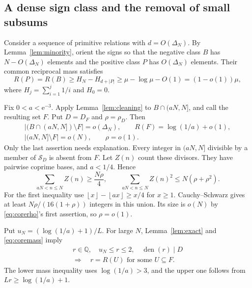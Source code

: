 \documentclass[11pt,leqno]{amsart}
\numberwithin{equation}{section}
\theoremstyle{definition}
\theoremstyle{remark}
\newcommand{\Q}{\mathbb Q}
\newcommand{\e}{\mathrm e}
\newcommand{\card}[1]{\lvert #1\rvert}
\newcommand{\floor}[1]{\left\lfloor #1\right\rfloor}
\begin{document}
\subsection{A dense sign class and the removal of small subsums}

Consider a sequence of primitive relations with $d=O(\Delta_N)$.
By Lemma~\ref{lem:minority}, orient the signs so that the negative
class $B$ has $N-O(\Delta_N)$ elements and the positive class $P$ has
$O(\Delta_N)$ elements. Their common reciprocal mass satisfies
\begin{equation}\label{eq:commonmass}
 R(P)=R(B)\ge H_N-H_{d+\card P}
 \ge\mu-\log\mu-O(1)=(1-o(1))\mu,
\end{equation}
where $H_j=\sum_{i=1}^j1/i$ and $H_0=0$.

Fix $0<a<\e^{-3}$. Apply Lemma~\ref{lem:cleaning} to $B\cap(aN,N]$,
and call the resulting set $F$. Put $D=D_F$ and $\rho=\rho_D$.
Then
\begin{gather}
 \card{(B\cap(aN,N])\setminus F}=o(\Delta_N),\qquad
 R(F)=\log(1/a)+o(1),\label{eq:coremass}\\
 \card{(aN,N]\setminus F}=o(N),\qquad \rho=o(1).
 \label{eq:corerho}
\end{gather}
Only the last assertion needs explanation. Every integer in $(aN,N]$
divisible by a member of $\mathcal S_D$ is absent from $F$.
Let $Z(n)$ count these divisors. They have pairwise coprime bases, and
$a<1/4$. Hence
\[
 \sum_{aN<n\le N}Z(n)\ge\frac{N\rho}{4},\qquad
 \sum_{aN<n\le N}Z(n)^2\le N(\rho+\rho^2).
\]
For the first inequality use
$\floor x-\floor{ax}\ge x/4$ for $x\ge1$.
Cauchy--Schwarz gives at least $N\rho/(16(1+\rho))$ integers in this
union. Its size is $o(N)$ by \eqref{eq:corerho}'s first assertion, so
$\rho=o(1)$.

Put $u_N=(\log(1/a)+1)/L$. For large $N$, Lemma~\ref{lem:exact} and
\eqref{eq:coremass} imply
\begin{equation}\label{eq:dense-targets}
 \begin{gathered}
 r\in\Q,\quad u_N\le r\le2,\quad \operatorname{den}(r)\mid D\\
 \Longrightarrow\quad r=R(U)\text{ for some }U\subseteq F.
 \end{gathered}
\end{equation}
The lower mass inequality uses $\log(1/a)>3$, and the upper one follows
from $Lr\ge\log(1/a)+1$.
\end{document}
